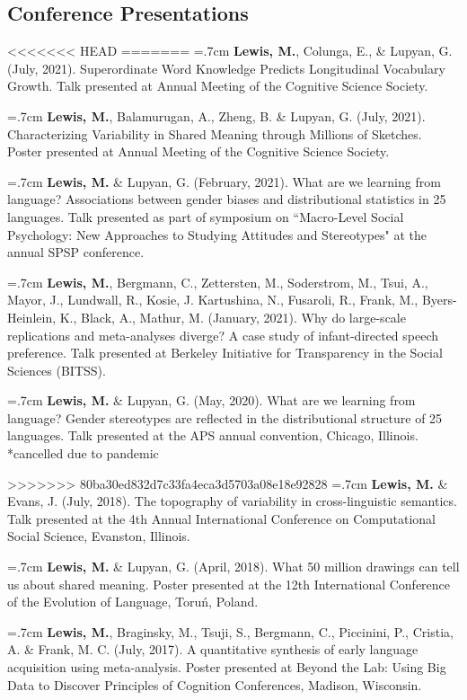 \documentclass[letterpaper]{article}
\begin{document}
\subsection*{Conference Presentations}

<<<<<<< HEAD
=======
 \hangindent=.7cm {\bf Lewis, M.}, Colunga, E., \& Lupyan, G. (July, 2021).  Superordinate Word Knowledge Predicts Longitudinal Vocabulary Growth.  Talk presented at Annual Meeting of the Cognitive Science Society.

      \hangindent=.7cm {\bf Lewis, M.},  Balamurugan, A., Zheng, B. \& Lupyan, G. (July, 2021). Characterizing Variability in Shared Meaning through Millions of Sketches.  Poster presented at  Annual Meeting of the Cognitive Science Society.
      

 \hangindent=.7cm {\bf Lewis, M.} \& Lupyan, G. (February, 2021). What are we learning from language? Associations between gender biases and distributional statistics in 25 languages.  Talk presented as part of symposium on ``Macro-Level Social Psychology: New Approaches to Studying Attitudes and Stereotypes" at the annual SPSP conference. 

 \hangindent=.7cm {\bf Lewis, M.}, Bergmann, C., Zettersten, M., Soderstrom, M., Tsui, A., Mayor, J., Lundwall, R., Kosie, J. Kartushina, N., Fusaroli, R., Frank, M., Byers-Heinlein, K., Black, A., Mathur, M. (January, 2021). Why do large-scale replications and meta-analyses diverge? A case study of infant-directed speech preference. Talk presented at Berkeley Initiative for Transparency in the Social Sciences (BITSS). 

 \hangindent=.7cm {\bf Lewis, M.} \& Lupyan, G. (May, 2020). What are we learning from language? Gender stereotypes are reflected in the distributional structure of 25 languages. Talk presented at the APS annual convention, Chicago, Illinois. *cancelled due to pandemic


>>>>>>> 80ba30ed832d7c33fa4eca3d5703a08e18e92828
 \hangindent=.7cm {\bf Lewis, M.} \& Evans, J. (July, 2018). The topography of variability in cross-linguistic semantics. Talk presented at the 4th Annual International Conference on Computational Social Science, Evanston, Illinois.

 \hangindent=.7cm {\bf Lewis, M.} \& Lupyan, G. (April, 2018). What 50 million drawings can tell us about shared meaning. Poster presented at the 12th International Conference of the Evolution of Language, Toru\'{n}, Poland.

 \hangindent=.7cm {\bf Lewis, M.}, Braginsky, M., Tsuji, S., Bergmann, C., Piccinini, P., Cristia, A. \& Frank, M. C. (July, 2017). A quantitative synthesis of early language acquisition using meta-analysis. Poster presented at Beyond the Lab: Using Big Data to Discover Principles of Cognition Conferences, Madison, Wisconsin.
\end{document}

